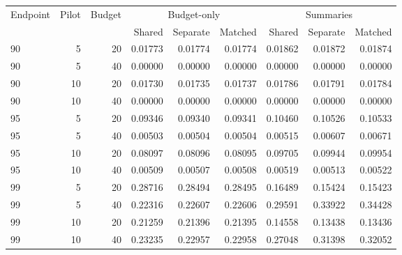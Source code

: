 \begin{tabular}{lrrrrrrrr}
\toprule
Endpoint & Pilot & Budget & \multicolumn{3}{c}{Budget-only} & \multicolumn{3}{c}{Summaries}\\
 & & & Shared & Separate & Matched & Shared & Separate & Matched\\
\midrule
90 & 5 & 20 & 0.01773 & 0.01774 & 0.01774 & 0.01862 & 0.01872 & 0.01874\\
90 & 5 & 40 & 0.00000 & 0.00000 & 0.00000 & 0.00000 & 0.00000 & 0.00000\\
90 & 10 & 20 & 0.01730 & 0.01735 & 0.01737 & 0.01786 & 0.01791 & 0.01784\\
90 & 10 & 40 & 0.00000 & 0.00000 & 0.00000 & 0.00000 & 0.00000 & 0.00000\\
95 & 5 & 20 & 0.09346 & 0.09340 & 0.09341 & 0.10460 & 0.10526 & 0.10533\\
95 & 5 & 40 & 0.00503 & 0.00504 & 0.00504 & 0.00515 & 0.00607 & 0.00671\\
95 & 10 & 20 & 0.08097 & 0.08096 & 0.08095 & 0.09705 & 0.09944 & 0.09954\\
95 & 10 & 40 & 0.00509 & 0.00507 & 0.00508 & 0.00519 & 0.00513 & 0.00522\\
99 & 5 & 20 & 0.28716 & 0.28494 & 0.28495 & 0.16489 & 0.15424 & 0.15423\\
99 & 5 & 40 & 0.22316 & 0.22607 & 0.22606 & 0.29591 & 0.33922 & 0.34428\\
99 & 10 & 20 & 0.21259 & 0.21396 & 0.21395 & 0.14558 & 0.13438 & 0.13436\\
99 & 10 & 40 & 0.23235 & 0.22957 & 0.22958 & 0.27048 & 0.31398 & 0.32052\\
\bottomrule
\end{tabular}
